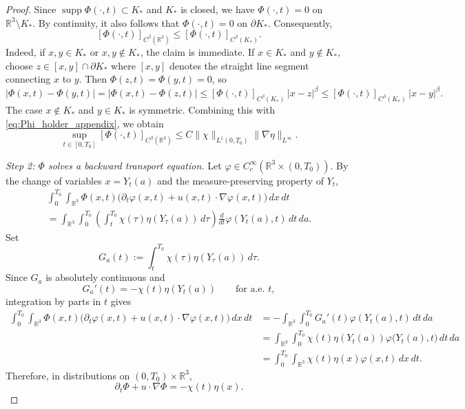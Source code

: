 \documentclass[10pt,a4paper]{amsart}
\newcommand{\supp}{\operatorname{supp}}
\begin{document}
\begin{proof}
Since $\supp \Phi(\cdot,t)\subset K_*$ and $K_*$ is closed, we have
$\Phi(\cdot,t)=0$ on $\mathbb R^3\setminus K_*$. By continuity, it also follows that
$\Phi(\cdot,t)=0$ on $\partial K_*$. Consequently,
\[
[\Phi(\cdot,t)]_{C^\beta(\mathbb R^3)}
\le
[\Phi(\cdot,t)]_{C^\beta(K_*)}.
\]
Indeed, if $x,y\in K_*$ or $x,y\notin K_*$, the claim is immediate. If $x\in K_*$ and
$y\notin K_*$, choose $z\in [x,y]\cap\partial K_*$
 where $[x,y]$ denotes the straight line segment connecting $x$ to $y$.
Then $\Phi(z,t)=\Phi(y,t)=0$, so
\[
|\Phi(x,t)-\Phi(y,t)|
=
|\Phi(x,t)-\Phi(z,t)|
\le
[\Phi(\cdot,t)]_{C^\beta(K_*)}\,|x-z|^\beta
\le
[\Phi(\cdot,t)]_{C^\beta(K_*)}\,|x-y|^\beta.
\]
The case $x\notin K_*$ and $y\in K_*$ is symmetric. Combining this with
\eqref{eq:Phi_holder_appendix}, we obtain
\begin{equation}
\label{eq:Phi_holder_global_appendix}
\sup_{t\in[0,T_0]}[\Phi(\cdot,t)]_{C^\beta(\mathbb R^3)}
\le
C\|\chi\|_{L^1(0,T_0)}\|\nabla\eta\|_{L^\infty}.
\end{equation}


\smallskip
\noindent\emph{Step 2: $\Phi$ solves a backward transport equation.}
Let $\varphi\in C_c^\infty(\mathbb R^3\times(0,T_0))$. By the change of variables
$x=Y_t(a)$ and the measure-preserving property of $Y_t$,
\begin{multline*}
\int_0^{T_0}\int_{\mathbb R^3}
\Phi(x,t)\bigl(\partial_t\varphi(x,t)+u(x,t)\cdot\nabla\varphi(x,t)\bigr)\,dx\,dt 
\\
=
\int_{\mathbb R^3}\int_0^{T_0}
\left(\int_t^{T_0}\chi(\tau)\eta(Y_\tau(a))\,d\tau\right)
\frac{d}{dt}\varphi(Y_t(a),t)\,dt\,da .
\end{multline*}
Set
\[
G_a(t):=\int_t^{T_0}\chi(\tau)\eta(Y_\tau(a))\,d\tau.
\]
Since $G_a$ is absolutely continuous and
\[
G_a'(t)=-\chi(t)\eta(Y_t(a))
\qquad\text{for a.e. }t,
\]
integration by parts in $t$ gives
\begin{align*}
\int_0^{T_0}\int_{\mathbb R^3}
\Phi(x,t)\bigl(\partial_t\varphi(x,t)+u(x,t)\cdot\nabla\varphi(x,t)\bigr)\,dx\,dt 
&=
-\int_{\mathbb R^3}\int_0^{T_0}G_a'(t)\varphi(Y_t(a),t)\,dt\,da \\
&=
\int_{\mathbb R^3}\int_0^{T_0}\chi(t)\eta(Y_t(a))\varphi\big(Y_t(a),t\big)\,dt\,da \\
&=
\int_0^{T_0}\int_{\mathbb R^3}\chi(t)\eta(x)\varphi(x,t)\,dx\,dt .
\end{align*}
Therefore, in distributions on $(0,T_0)\times\mathbb R^3$,
\begin{equation}
\label{eq:Phi_backward_appendix}
\partial_t\Phi+u\cdot\nabla\Phi=-\chi(t)\eta(x).
\end{equation}


\end{proof}
\end{document}
